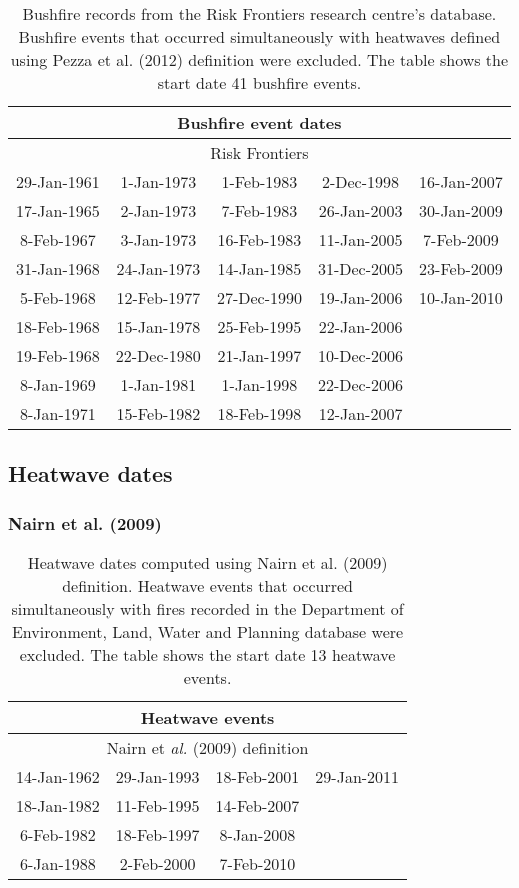 \begin{table}[H]
\caption{Bushfire records from the Risk Frontiers research centre's database.
Bushfire events that occurred simultaneously with heatwaves defined
using Pezza et al. (2012) definition were excluded. The table shows
the start date 41 bushfire events.}


\centering{}%
\begin{tabular}{|c|c|c|c|c|}
\hline 
\multicolumn{5}{|c|}{\textbf{Bushfire event dates}}\tabularnewline
\hline 
\hline 
\multicolumn{5}{|c|}{Risk Frontiers}\tabularnewline
\hline 
29-Jan-1961 & 1-Jan-1973 & 1-Feb-1983 & 2-Dec-1998 & 16-Jan-2007\tabularnewline
\hline 
17-Jan-1965 & 2-Jan-1973 & 7-Feb-1983 & 26-Jan-2003 & 30-Jan-2009\tabularnewline
\hline 
8-Feb-1967 & 3-Jan-1973 & 16-Feb-1983 & 11-Jan-2005 & 7-Feb-2009\tabularnewline
\hline 
31-Jan-1968 & 24-Jan-1973 & 14-Jan-1985 & 31-Dec-2005 & 23-Feb-2009\tabularnewline
\hline 
5-Feb-1968 & 12-Feb-1977 & 27-Dec-1990 & 19-Jan-2006 & 10-Jan-2010\tabularnewline
\hline 
18-Feb-1968 & 15-Jan-1978 & 25-Feb-1995 & 22-Jan-2006 & \tabularnewline
\hline 
19-Feb-1968 & 22-Dec-1980 & 21-Jan-1997 & 10-Dec-2006 & \tabularnewline
\hline 
8-Jan-1969 & 1-Jan-1981 & 1-Jan-1998 & 22-Dec-2006 & \tabularnewline
\hline 
8-Jan-1971 & 15-Feb-1982 & 18-Feb-1998 & 12-Jan-2007 & \tabularnewline
\hline 
\end{tabular}
\end{table}



\subsection{Heatwave dates }


\subsubsection{Nairn et al. (2009) }

\begin{table}[H]
\caption{Heatwave dates computed using Nairn et al. (2009) definition. Heatwave
events that occurred simultaneously with fires recorded in the Department
of Environment, Land, Water and Planning database were excluded. The
table shows the start date 13 heatwave events. \label{tab:Heatwave dates computed using Nairn et al. (2009) definition}}


\centering{}%
\begin{tabular}{|c|c|c|c|}
\hline 
\multicolumn{4}{|c|}{\textbf{Heatwave events }}\tabularnewline
\hline 
\hline 
\multicolumn{4}{|c|}{Nairn et \textit{al.} (2009) definition}\tabularnewline
\hline 
14-Jan-1962 & 29-Jan-1993 & 18-Feb-2001 & 29-Jan-2011\tabularnewline
\hline 
18-Jan-1982 & 11-Feb-1995 & 14-Feb-2007 & \tabularnewline
\hline 
6-Feb-1982 & 18-Feb-1997 & 8-Jan-2008 & \tabularnewline
\hline 
6-Jan-1988 & 2-Feb-2000 & 7-Feb-2010 & \tabularnewline
\hline 
\end{tabular}
\end{table}



